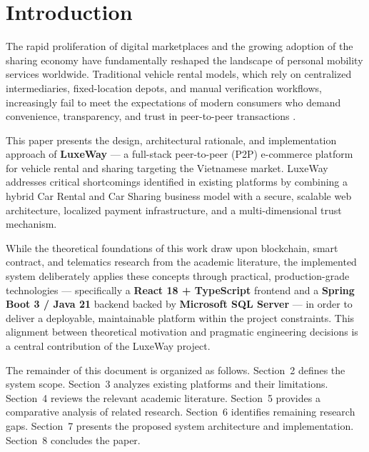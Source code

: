 \section{Introduction}

The rapid proliferation of digital marketplaces and the growing adoption of the sharing economy have fundamentally reshaped the landscape of personal mobility services worldwide. Traditional vehicle rental models, which rely on centralized intermediaries, fixed-location depots, and manual verification workflows, increasingly fail to meet the expectations of modern consumers who demand convenience, transparency, and trust in peer-to-peer transactions \cite{kauffman2020research}.

This paper presents the design, architectural rationale, and implementation approach of \textbf{LuxeWay} --- a full-stack peer-to-peer (P2P) e-commerce platform for vehicle rental and sharing targeting the Vietnamese market. LuxeWay addresses critical shortcomings identified in existing platforms by combining a hybrid Car Rental and Car Sharing business model with a secure, scalable web architecture, localized payment infrastructure, and a multi-dimensional trust mechanism.

While the theoretical foundations of this work draw upon blockchain, smart contract, and telematics research from the academic literature, the implemented system deliberately applies these concepts through practical, production-grade technologies --- specifically a \textbf{React 18 + TypeScript} frontend and a \textbf{Spring Boot 3 / Java 21} backend backed by \textbf{Microsoft SQL Server} --- in order to deliver a deployable, maintainable platform within the project constraints. This alignment between theoretical motivation and pragmatic engineering decisions is a central contribution of the LuxeWay project.

The remainder of this document is organized as follows. Section~2 defines the system scope. Section~3 analyzes existing platforms and their limitations. Section~4 reviews the relevant academic literature. Section~5 provides a comparative analysis of related research. Section~6 identifies remaining research gaps. Section~7 presents the proposed system architecture and implementation. Section~8 concludes the paper.

